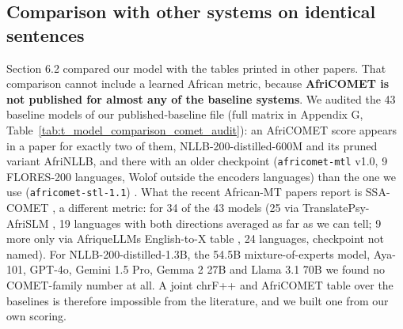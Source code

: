 \subsection{Comparison with other systems on identical sentences}\label{comparison-with-other-systems-on-identical-sentences}

Section 6.2 compared our model with the tables printed in other papers. That comparison cannot include a learned African metric, because \textbf{AfriCOMET is not published for almost any of the baseline systems}. We audited the 43 baseline models of our published-baseline file (full matrix in Appendix G, Table~\ref{tab:t_model_comparison_comet_audit}): an AfriCOMET score appears in a paper for exactly two of them, NLLB-200-distilled-600M and its pruned variant AfriNLLB, and there with an older checkpoint (\texttt{africomet-mtl} v1.0, 9 FLORES-200 languages, Wolof outside the encoder\textquotesingle s languages) than the one we use (\texttt{africomet-stl-1.1}) \citep{moslem2026afrinllb}. What the recent African-MT papers report is SSA-COMET \citep{li2025ssacomet}, a different metric: for 34 of the 43 models (25 via TranslatePsy-AfriSLM \citep{gritta2026translatepsy}, 19 languages with both directions averaged as far as we can tell; 9 more only via AfriqueLLM\textquotesingle s English-to-X table \citep{yu2026afriquellm}, 24 languages, checkpoint not named). For NLLB-200-distilled-1.3B, the 54.5B mixture-of-experts model, Aya-101, GPT-4o, Gemini 1.5 Pro, Gemma 2 27B and Llama 3.1 70B we found no COMET-family number at all. A joint chrF++ and AfriCOMET table over the baselines is therefore impossible from the literature, and we built one from our own scoring.

